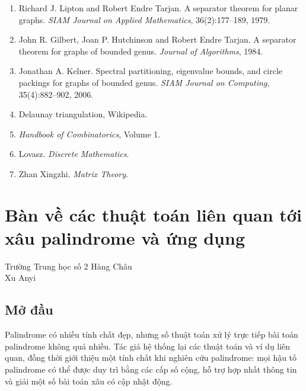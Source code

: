 \documentclass[11pt]{article}
\begin{document}
\begin{enumerate}
  \item Richard J. Lipton and Robert Endre Tarjan. A separator theorem for
  planar graphs. \emph{SIAM Journal on Applied Mathematics}, 36(2):177--189,
  1979.
  \item John R. Gilbert, Joan P. Hutchinson and Robert Endre Tarjan. A separator
  theorem for graphs of bounded genus. \emph{Journal of Algorithms}, 1984.
  \item Jonathan A. Kelner. Spectral partitioning, eigenvalue bounds, and circle
  packings for graphs of bounded genus. \emph{SIAM Journal on Computing},
  35(4):882--902, 2006.
  \item Delaunay triangulation, Wikipedia.
  \item \emph{Handbook of Combinatorics}, Volume 1.
  \item Lovasz. \emph{Discrete Mathematics}.
  \item Zhan Xingzhi. \emph{Matrix Theory}.
\end{enumerate}

\section{Bàn về các thuật toán liên quan tới xâu palindrome và ứng dụng}

\begin{center}
Trường Trung học số 2 Hàng Châu\\
Xu Anyi
\end{center}

\renewcommand{\abstractname}{Tóm tắt}
\begin{abstract}
Các bài toán liên quan tới xâu palindrome là một lớp bài thường gặp trong thi
tin học. Bài viết giới thiệu một số thuật toán thông dụng cho palindrome: hash
xâu, thuật toán Manacher, cây palindrome và cách duy trì mọi hậu tố palindrome
dưới dạng các cấp số cộng. Ngoài ra, bài viết trình bày ứng dụng mở rộng của
việc duy trì thông tin mọi hậu tố palindrome bằng cấp số cộng.
\end{abstract}

\subsection{Mở đầu}

Palindrome có nhiều tính chất đẹp, nhưng số thuật toán xử lý trực tiếp bài toán
palindrome không quá nhiều. Tác giả hệ thống lại các thuật toán và ví dụ liên
quan, đồng thời giới thiệu một tính chất khi nghiên cứu palindrome: mọi hậu tố
palindrome có thể được duy trì bằng các cấp số cộng, hỗ trợ hợp nhất thông tin
và giải một số bài toán xâu có cập nhật động.
\end{document}
